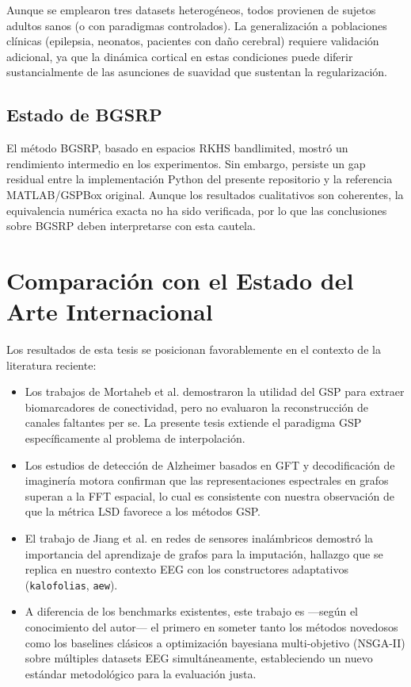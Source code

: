 Aunque se emplearon tres datasets heterogéneos, todos provienen de sujetos adultos sanos (o con paradigmas controlados). La generalización a poblaciones clínicas (epilepsia, neonatos, pacientes con daño cerebral) requiere validación adicional, ya que la dinámica cortical en estas condiciones puede diferir sustancialmente de las asunciones de suavidad que sustentan la regularización.

\subsection{Estado de BGSRP}

El método BGSRP, basado en espacios RKHS bandlimited, mostró un rendimiento intermedio en los experimentos. Sin embargo, persiste un gap residual entre la implementación Python del presente repositorio y la referencia MATLAB/GSPBox original. Aunque los resultados cualitativos son coherentes, la equivalencia numérica exacta no ha sido verificada, por lo que las conclusiones sobre BGSRP deben interpretarse con esta cautela.

\section{Comparación con el Estado del Arte Internacional}

Los resultados de esta tesis se posicionan favorablemente en el contexto de la literatura reciente:
\begin{itemize}
    \item Los trabajos de Mortaheb et al. \cite{mortaheb_graph_2019} demostraron la utilidad del GSP para extraer biomarcadores de conectividad, pero no evaluaron la reconstrucción de canales faltantes per se. La presente tesis extiende el paradigma GSP específicamente al problema de interpolación.
    \item Los estudios de detección de Alzheimer basados en GFT \cite{mootoo_detecting_2023} y decodificación de imaginería motora \cite{miri_spectral_2024} confirman que las representaciones espectrales en grafos superan a la FFT espacial, lo cual es consistente con nuestra observación de que la métrica LSD favorece a los métodos GSP.
    \item El trabajo de Jiang et al. \cite{jiang_graph-based_2021} en redes de sensores inalámbricos demostró la importancia del aprendizaje de grafos para la imputación, hallazgo que se replica en nuestro contexto EEG con los constructores adaptativos (\texttt{kalofolias}, \texttt{aew}).
    \item A diferencia de los benchmarks existentes, este trabajo es ---según el conocimiento del autor--- el primero en someter tanto los métodos novedosos como los baselines clásicos a optimización bayesiana multi-objetivo (NSGA-II) sobre múltiples datasets EEG simultáneamente, estableciendo un nuevo estándar metodológico para la evaluación justa.
\end{itemize}

